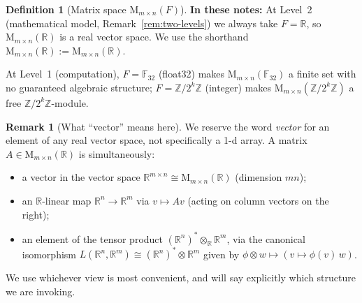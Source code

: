 \documentclass[11pt]{amsart}
\theoremstyle{plain}
\theoremstyle{definition}
\newtheorem{definition}[theorem]{Definition}
\newtheorem{remark}[theorem]{Remark}
\newcommand{\R}{\mathbb{R}}
\newcommand{\Mat}[2]{\mathrm{M}_{#1 \times #2}(\R)}
\begin{document}
\begin{definition}[Matrix space $\mathrm{M}_{m \times n}(F)$]
\medskip
\noindent\textbf{In these notes:}
At Level~2 (mathematical model, Remark~\ref{rem:two-levels}) we always take
$F = \mathbb{R}$, so $\mathrm{M}_{m \times n}(\mathbb{R})$ is a real vector
space.  We use the shorthand $\Mat{m}{n} := \mathrm{M}_{m \times n}(\mathbb{R})$.

At Level~1 (computation), $F = \mathbb{F}_{32}$ (float32) makes
$\mathrm{M}_{m \times n}(\mathbb{F}_{32})$ a finite set with no
guaranteed algebraic structure; $F = \mathbb{Z}/2^k\mathbb{Z}$ (integer)
makes $\mathrm{M}_{m \times n}(\mathbb{Z}/2^k\mathbb{Z})$ a free
$\mathbb{Z}/2^k\mathbb{Z}$-module.
\end{definition}

\begin{remark}[What ``vector'' means here]
We reserve the word \emph{vector} for an element of any real vector space,
not specifically a 1-d array.  A matrix $A \in \Mat{m}{n}$ is simultaneously:
\begin{itemize}
    \item a vector in the vector space $\mathbb{R}^{m \times n} \cong \Mat{m}{n}$
    (dimension $mn$);
    \item an $\mathbb{R}$-linear map $\mathbb{R}^n \to \mathbb{R}^m$ via $v \mapsto Av$
    (acting on column vectors on the right);
    \item an element of the tensor product $(\mathbb{R}^n)^* \otimes_\mathbb{R} \mathbb{R}^m$,
    via the canonical isomorphism $L(\mathbb{R}^n, \mathbb{R}^m) \cong (\mathbb{R}^n)^* \otimes \mathbb{R}^m$
    given by $\phi \otimes w \mapsto (v \mapsto \phi(v)\,w)$.
\end{itemize}
We use whichever view is most convenient, and will say explicitly which
structure we are invoking.
\end{remark}
\end{document}
